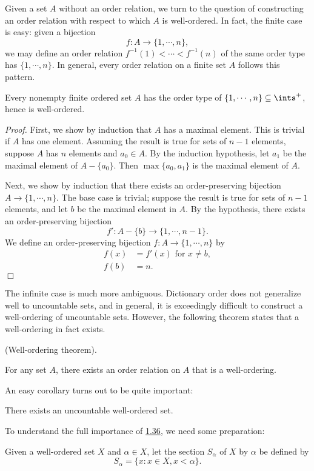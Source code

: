 Given a set $A$ without an order relation, we turn to the question of constructing an order relation with respect to which $A$ is well-ordered. In fact, the finite case is easy: given a bijection
$$f: A\rightarrow \{1, \cdots, n\},$$
we may define an order relation $f^{-1}(1) < \cdots < f^{-1}(n)$ of the same order type has $\{1, \cdots, n\}$. In general, every order relation on a finite set $A$ follows this pattern.
\begin{theorem}\label{1.34}
    Every nonempty finite ordered set $A$ has the order type of $\{1,\cdots, n\} \subseteq \ints^+$, hence is well-ordered.
\end{theorem}
{\it Proof.} First, we show by induction that $A$ has a maximal element. This is trivial if $A$ has one element. Assuming the result is true for sets of $n-1$ elements, suppose $A$ has $n$ elements and $a_0 \in A.$ By the induction hypothesis, let $a_1$ be the maximal element of $A- \{a_0\}$. Then $\max \{a_0, a_1\}$ is the maximal element of $A$.

Next, we show by induction that there exists an order-preserving bijection $A \rightarrow \{1, \cdots, n\}$. The base case is trivial; suppose the result is true for sets of $n-1$ elements, and let $b$ be the maximal element in $A$. By the hypothesis, there exists an order-preserving bijection
$$f': A- \{b\} \rightarrow \{1, \cdots, n-1\}.$$
We define an order-preserving bijection $f: A \rightarrow \{1, \cdots, n\}$ by
\begin{align*}
    f(x) &= f'(x) \text{ for } x \neq b, \\
    f(b) &= n.
\end{align*}
$\Box$

The infinite case is much more ambiguous. Dictionary order does not generalize well to uncountable sets, and in general, it is exceedingly difficult to construct a well-ordering of uncountable sets. However, the following theorem states that a well-ordering in fact exists.
\begin{theorem}\label{1.35}
    (Well-ordering theorem).
    \vspace{10pt}

    For any set $A$, there exists an order relation on $A$ that is a well-ordering.
\end{theorem}
An easy corollary turns out to be quite important:
\begin{corollary}\label{1.36}
    There exists an uncountable well-ordered set.
\end{corollary}
To understand the full importance of \hyperref[1.36]{1.36}, we need some preparation:
\begin{definition}\label{1.37}
    Given a well-ordered set $X$ and $\alpha \in X$, let the section $S_\alpha$ of $X$ by $\alpha$ be defined by
    $$S_\alpha = \{x: x \in X, x < \alpha\}.$$
\end{definition}

